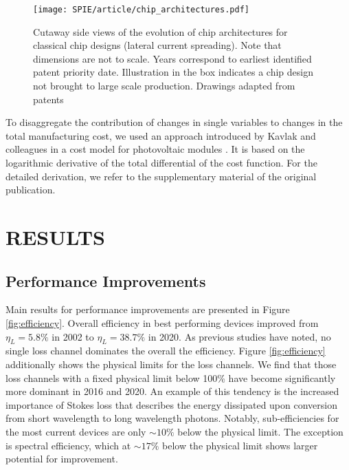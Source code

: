 \documentclass[a4paper,nocompress]{spie}  %
\begin{document}
        \begin{figure} [ht]
            \begin{center}
                \texttt{[image: SPIE/article/chip\_architectures.pdf]}
            \end{center}
            \caption{Cutaway side views of the evolution of chip architectures for classical chip designs (lateral current spreading). Note that dimensions are not to scale. Years correspond to earliest identified patent priority date. Illustration in the box indicates a chip design not brought to large scale production. Drawings adapted from patents \cite{nagahama2013nitride,tanaka2010semiconductor,wierer2006photonic}}
            \label{fig:chip_arch}
        \end{figure}

        To disaggregate the contribution of changes in single variables to changes in the total manufacturing cost, we used an approach introduced by Kavlak and colleagues in a cost model for photovoltaic modules \cite{kavlak2018evaluating}. It is based on the logarithmic derivative of the total differential of the cost function. For the detailed derivation, we refer to the supplementary material of the original publication.

\section{RESULTS}

\subsection{Performance Improvements}

     Main results for performance improvements are presented in Figure \ref{fig:efficiency}. Overall efficiency in best performing devices improved from $\eta_L=5.8\%$ in 2002 to $\eta_L = 38.7\%$ in 2020. As previous studies have noted, no single loss channel dominates the overall the efficiency\cite{tsao2010solid}. Figure \ref{fig:efficiency} additionally shows the physical limits for the loss channels. We find that those loss channels with a fixed physical limit below 100\% have become significantly more dominant in 2016 and 2020. An example of this tendency is the increased importance of Stokes loss that describes the energy dissipated upon conversion from short wavelength to long wavelength photons. Notably, sub-efficiencies for the most current devices are only $\sim10\%$ below the physical limit. The exception is spectral efficiency, which at $\sim17\%$ below the physical limit shows larger potential for improvement.
     
\end{document}
